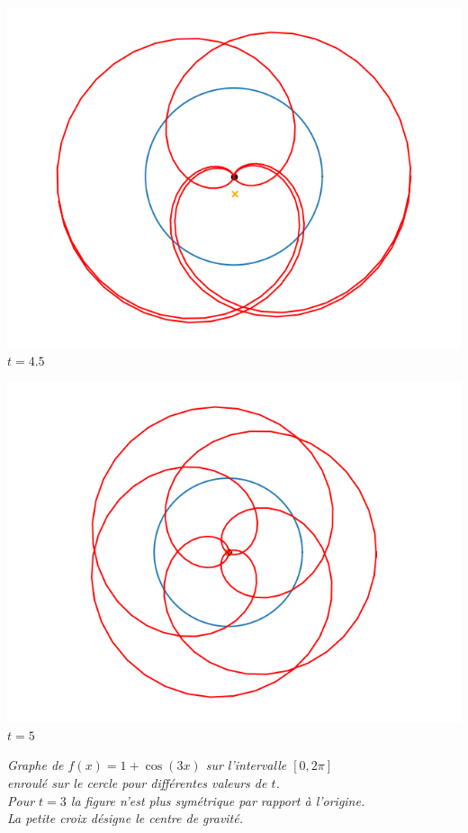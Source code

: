\documentclass[11pt,class=report,crop=false]{standalone}
\begin{document}
\begin{center}
\begin{minipage}{0.25\textwidth}
	\center \includegraphics[scale=\myscale,scale=0.3]{figures/fourier-6-450}
	$t = 4.5$ 
	\end{minipage}
	\begin{minipage}{0.23\textwidth}
	\center \includegraphics[scale=\myscale,scale=0.3]{figures/fourier-6-500}
	$t = 5$ 
	\end{minipage}

\medskip

\nopagebreak


\begin{minipage}{0.8\textwidth}
  \center\emph{Graphe de $f(x) = 1+\cos(3x)$ sur l'intervalle $[0,2\pi]$\\
    enroulé sur le cercle pour différentes valeurs de $t$.\\
    Pour $t=3$ la figure n'est plus symétrique par rapport à l'origine.\\
    La petite croix désigne le centre de gravité.
}
\end{minipage}

\end{center}
\end{document}
